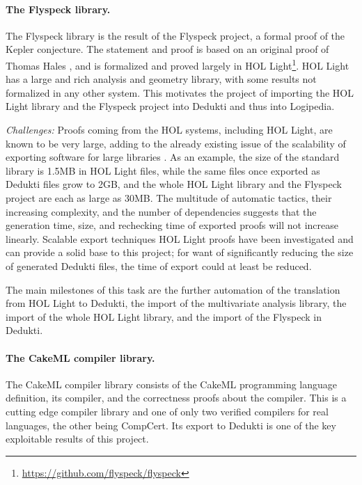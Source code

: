 \paragraph*{The Flyspeck library.}

The Flyspeck library
is the result of the Flyspeck
project, a formal proof of the Kepler conjecture. The statement and
proof is based on an original proof of Thomas Hales
\cite{DBLP:journals/corr/HalesABDHHKMMNNNOPRSTTTUVZ15}, and is
formalized and proved largely in HOL
Light\footnote{\url{https://github.com/flyspeck/flyspeck}}. HOL Light
has a large and rich analysis and geometry library, with some results
not formalized in any other system. This motivates the project of
importing the HOL Light library and the Flyspeck project into
Dedukti and thus into Logipedia.

\emph{Challenges:}
Proofs coming from the HOL systems, including {HOL Light}, are known to
be very large, adding to the already existing issue of the scalability of
exporting software for large libraries
\cite{DBLP:conf/tphol/Wong95,DBLP:conf/cade/ObuaS06,DBLP:conf/itp/KellerW10,
DBLP:conf/cade/Kumar13}. As an example, the size of the standard library is
1.5MB in {HOL Light} files, while the same files once
exported as {Dedukti} files grow to 2GB, and the whole
{HOL Light} library and the {Flyspeck} project are each as
large as 30MB. The multitude of automatic tactics, their increasing
complexity, and the number of dependencies suggests that the generation time, size,
and rechecking time of exported proofs will not increase linearly. Scalable
export techniques {HOL Light} proofs have been investigated
\cite{KaliszykK13} and can provide a solid base to
this project; for want of significantly reducing the size of generated
{Dedukti} files, the time of export could at least be reduced.

The main milestones of this task are the further automation of the
translation from {HOL Light} to {Dedukti}, the import of the
multivariate analysis library, the import of the whole {HOL Light}
library, and the import of the {Flyspeck} in {Dedukti}.

\paragraph*{The CakeML compiler library.}

The CakeML compiler library consists of the CakeML programming language
definition, its compiler, and the correctness proofs about the
compiler. This is a cutting edge compiler library and one of only two
verified compilers for real languages, the other being CompCert. Its
export to Dedukti is one of the key exploitable results of this project.

